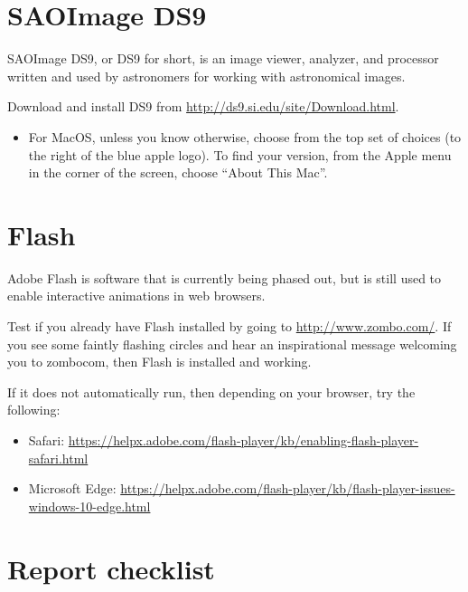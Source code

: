 \section{SAOImage DS9}

SAOImage DS9, or DS9 for short, is an image viewer, analyzer, and processor written and used by astronomers for working with astronomical images.

\begin{steps}
	\item Download and install DS9 from \url{http://ds9.si.edu/site/Download.html}.
	\begin{itemize}
		\item For MacOS, unless you know otherwise, choose from the top set of choices (to the right of the blue apple logo). To find your version, from the Apple menu in the corner of the screen, choose ``About This Mac''.
	\end{itemize}
\end{steps}

\section{Flash}

Adobe Flash is software that is currently being phased out, but is still used to enable interactive animations in web browsers.

\begin{steps}
	\item Test if you already have Flash installed by going to \url{http://www.zombo.com/}. If you see some faintly flashing circles and hear an inspirational message welcoming you to zombocom, then Flash is installed and working.
	
	If it does not automatically run, then depending on your browser, try the following:
	\begin{itemize}
		\item Safari: \url{https://helpx.adobe.com/flash-player/kb/enabling-flash-player-safari.html}
		
		\item Microsoft Edge: \url{https://helpx.adobe.com/flash-player/kb/flash-player-issues-windows-10-edge.html}
	\end{itemize}
	
\end{steps}

\section{Report checklist}

